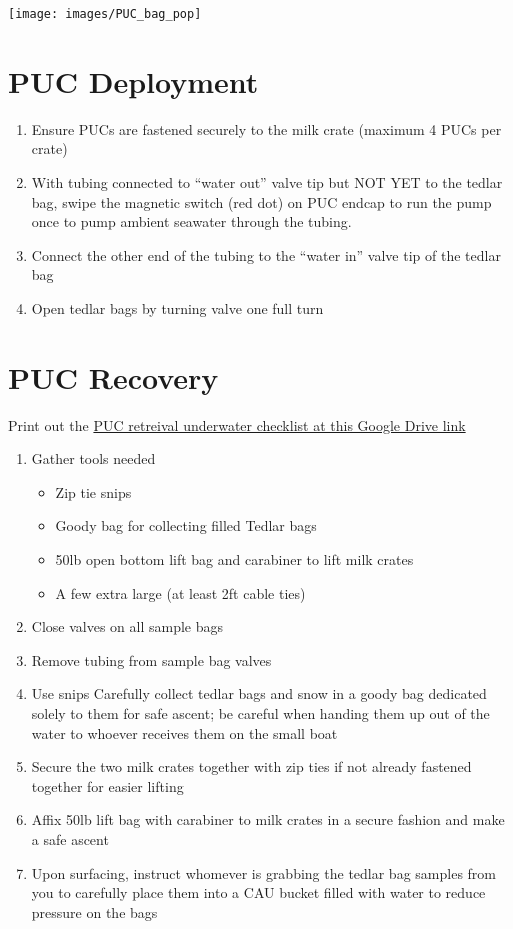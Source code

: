 \documentclass[]{book}
\providecommand{\tightlist}{%
  \setlength{\itemsep}{0pt}\setlength{\parskip}{0pt}}
\begin{document}
\texttt{[image: images/PUC\_bag\_pop]}

\hypertarget{puc-deployment}{%
\section{PUC Deployment}\label{puc-deployment}}

\begin{enumerate}
\def\labelenumi{\arabic{enumi}.}
\tightlist
\item
  Ensure PUCs are fastened securely to the milk crate (maximum 4 PUCs per crate)
\item
  With tubing connected to ``water out'' valve tip but NOT YET to the tedlar bag, swipe the magnetic switch (red dot) on PUC endcap to run the pump once to pump ambient seawater through the tubing.
\item
  Connect the other end of the tubing to the ``water in'' valve tip of the tedlar bag
\item
  Open tedlar bags by turning valve one full turn
\end{enumerate}

\hypertarget{puc-recovery}{%
\section{PUC Recovery}\label{puc-recovery}}

Print out the \href{https://drive.google.com/drive/folders/1X6fAG4OIDs66Ji5xzYsX8JySqhkSs5k-}{PUC retreival underwater checklist at this Google Drive link}

\begin{enumerate}
\def\labelenumi{\arabic{enumi}.}
\tightlist
\item
  Gather tools needed

  \begin{itemize}
  \tightlist
  \item
    Zip tie snips
  \item
    Goody bag for collecting filled Tedlar bags
  \item
    50lb open bottom lift bag and carabiner to lift milk crates
  \item
    A few extra large (at least 2ft cable ties)
  \end{itemize}
\item
  Close valves on all sample bags
\item
  Remove tubing from sample bag valves
\item
  Use snips Carefully collect tedlar bags and snow in a goody bag dedicated solely to them for safe ascent; be careful when handing them up out of the water to whoever receives them on the small boat
\item
  Secure the two milk crates together with zip ties if not already fastened together for easier lifting
\item
  Affix 50lb lift bag with carabiner to milk crates in a secure fashion and make a safe ascent
\item
  Upon surfacing, instruct whomever is grabbing the tedlar bag samples from you to carefully place them into a CAU bucket filled with water to reduce pressure on the bags
\end{enumerate}
\end{document}
